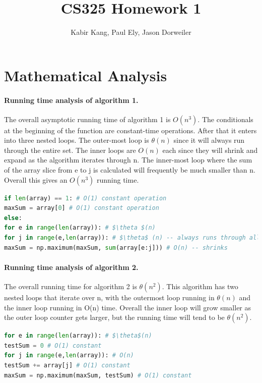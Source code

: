 \documentclass[a4paper,12pt]{article}
\title{CS325 Homework 1}
\author{Kabir Kang, Paul Ely, Jason Dorweiler}
\begin{document}
\maketitle

\section{Mathematical Analysis}


\paragraph{Running time analysis of algorithm 1.} The overall asymptotic running time of algorithm 1 is $O(n^3)$. The conditionals at the beginning of the function are constant-time operations. After that it enters into three nested loops. The outer-most loop is $\theta(n)$ since it will always run through the entire set. The inner loops are $O(n)$ each since they will shrink and expand as the algorithm iterates through n. The inner-most loop where the sum of the array slice from e to j is calculated will frequently be much smaller than n. Overall this gives an $O(n^3)$ running time.

  \begin{lstlisting}[language=python,caption={pseudo code for $n^3$ algorithm},mathescape]
if len(array) == 1: # O(1) constant operation
maxSum = array[0] # O(1) constant operation
else:
for e in range(len(array)): # $\theta $(n)
for j in range(e,len(array)): # $\theta$ (n) -- always runs through all elements
maxSum = np.maximum(maxSum, sum(array[e:j])) # O(n) -- shrinks
  \end{lstlisting}

\paragraph{Running time analysis of algorithm 2.} The overall running time for algorithm 2 is $\theta(n^2)$. This algorithm has two nested loops that iterate over n, with the outermost loop running in $\theta(n)$ and the inner loop running in O(n) time. Overall the inner loop will grow smaller as the outer loop counter gets larger, but the running time will tend to be $\theta(n^2)$.
  \begin{lstlisting}[language=python,caption={pseudo code for $n^2$ algorithm},mathescape]
for e in range(len(array)): # $\theta$(n)
testSum = 0 # O(1) constant
for j in range(e,len(array)): # O(n)
testSum += array[j] # O(1) constant
maxSum = np.maximum(maxSum, testSum) # O(1) constant
  \end{lstlisting}
\end{document}
